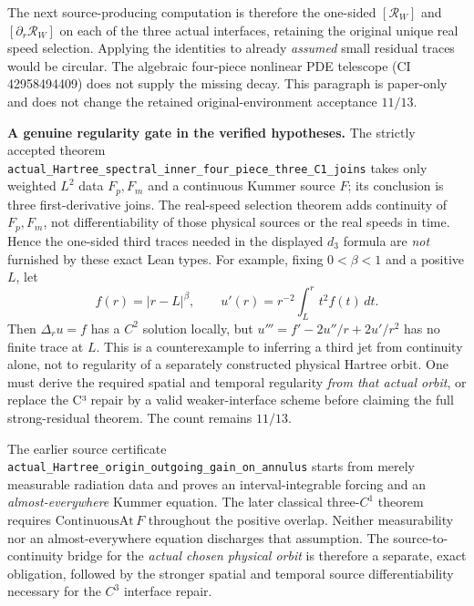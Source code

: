 The next source-producing computation is therefore the one-sided
\([\mathscr R_W]\) and \([\partial_r\mathscr R_W]\) on each of the three
actual interfaces, retaining the original unique real speed selection.
Applying the identities to already \emph{assumed} small residual traces
would be circular. The algebraic four-piece nonlinear PDE telescope
(CI 42958494409) does not supply the missing decay.
This paragraph is paper-only and does not change the retained
original-environment acceptance \(11/13\).


\medskip
\noindent\textbf{A genuine regularity gate in the verified hypotheses.}
The strictly accepted theorem
\texttt{actual\_Hartree\_spectral\_inner\_four\_piece\_three\_C1\_joins}
takes only weighted \(L^2\) data \(F_p,F_m\) and a continuous
Kummer source \(F\); its conclusion is three first-derivative joins.
The real-speed selection theorem adds continuity of \(F_p,F_m\),
not differentiability of those physical sources or the real speeds
in time. Hence the one-sided third traces needed in the displayed
\(d_3\) formula are \emph{not} furnished by these exact Lean types.
For example, fixing \(0<\beta<1\) and a positive \(L\), let
\[
 f(r)=|r-L|^\beta,\qquad
 u'(r)=r^{-2}\int_L^r t^2f(t)\,dt.
\]
Then \(\Delta_r u=f\) has a \(C^2\) solution locally, but
\(u'''=f'-2u''/r+2u'/r^2\) has no finite trace at \(L\).
This is a counterexample to inferring a third jet from continuity
alone, not to regularity of a separately constructed physical
Hartree orbit. One must derive the required spatial and temporal
regularity \emph{from that actual orbit}, or replace the C³ repair
by a valid weaker-interface scheme before claiming the full
strong-residual theorem. The count remains \(11/13\).


The earlier source certificate
\texttt{actual\_Hartree\_origin\_outgoing\_gain\_on\_annulus}
starts from merely measurable radiation data and proves an
interval-integrable forcing and an \emph{almost-everywhere} Kummer
equation. The later classical three-\(C^1\) theorem requires
\(\mathrm{ContinuousAt}\,F\) throughout the positive overlap.
Neither measurability nor an almost-everywhere equation discharges
that assumption. The source-to-continuity bridge for the
\emph{actual chosen physical orbit} is therefore a separate, exact
obligation, followed by the stronger spatial and temporal source
differentiability necessary for the \(C^3\) interface repair.


